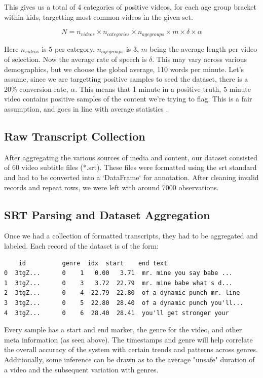 \documentclass{article}[A4]
\begin{document}
This gives us a total of 4 categories of positive videos, for each age group bracket within kids, targetting most common videos in the given set.

$$
N = n_{videos} \times n_{categories} \times n_{age groups} \times m \times \delta \times \alpha
$$

Here $n_{videos}$ is 5 per category, $n_{age groups}$ is 3, $m$ being the average length per video of selection. Now the average rate of speech
is $\delta$. This may vary across various demographics, but we choose the global average, 110 words per minute. Let's assume, since we are targetting
positive samples to seed the dataset, there is a 20\% conversion rate, $\alpha$. This means that 1 minute in a positive truth, 5 minute video contains
positive samples of the content we're trying to flag. This is a fair assumption, and goes in line with average statistics \citep{videostats}.

\subsection{Raw Transcript Collection}

After aggregating the various sources of media and content, our dataset consisted of 60 video subtitle files (*.srt). These files were formatted using the srt standard and had to be converted into a `DataFrame` for annotation. After cleaning invalid records and repeat rows, we were left with around 7000 observations.

\subsection{SRT Parsing and Dataset Aggregation}

Once we had a collection of formatted transcripts, they had to be aggregated and labeled. Each record of the dataset is of the form:
\begin{verbatim}
	id  		genre  idx  start    end text 
0  3tgZ...      0    1   0.00   3.71  mr. mine you say babe ...
1  3tgZ...      0    3   3.72  22.79  mr. mine babe what's d...
2  3tgZ...      0    4  22.79  22.80  of a dynamic punch mr. line 
3  3tgZ...      0    5  22.80  28.40  of a dynamic punch you'll... 
4  3tgZ...      0    6  28.40  28.41  you'll get stronger your 
\end{verbatim}

Every sample has a start and end marker, the genre for the video, and other meta information (as seen above). The timestamps and genre will help correlate the overall accuracy of the system with certain trends and patterns across genres. Additionally, some inference can be drawn as to the average "unsafe" duration of a video and the subsequent variation with genres. \\
\end{document}
